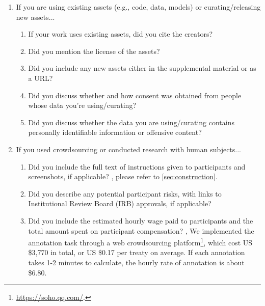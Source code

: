 \begin{enumerate}
\item If you are using existing assets (e.g., code, data, models) or curating/releasing new assets...
\begin{enumerate}
  \item If your work uses existing assets, did you cite the creators?
    \answerYes{}
  \item Did you mention the license of the assets?
    \answerYes{}
  \item Did you include any new assets either in the supplemental material or as a URL?
    \answerYes{}
  \item Did you discuss whether and how consent was obtained from people whose data you're using/curating?
    \answerYes{}
  \item Did you discuss whether the data you are using/curating contains personally identifiable information or offensive content?
    \answerYes{}
\end{enumerate}

\item If you used crowdsourcing or conducted research with human subjects...
\begin{enumerate}
  \item Did you include the full text of instructions given to participants and screenshots, if applicable?
    \answerYes{}, please refer to \cref{sec:construction}.
  \item Did you describe any potential participant risks, with links to Institutional Review Board (IRB) approvals, if applicable?
    \answerYes{}
  \item Did you include the estimated hourly wage paid to participants and the total amount spent on participant compensation?
    \answerYes{}, We implemented the annotation task through a web crowdsourcing platform\footnote{\url{https://soho.qq.com/}.}, which cost US \$3,770 in total, or US \$0.17 per treaty on average. If each annotation takes 1-2 minutes to calculate, the hourly rate of annotation is about \$6.80.
\end{enumerate}

\end{enumerate}